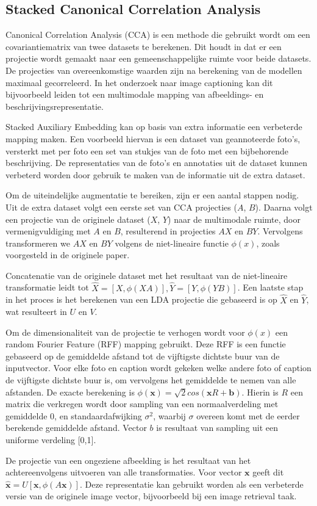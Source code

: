 \subsection{Stacked Canonical Correlation Analysis}
\label{sub:stackedcca}
Canonical Correlation Analysis (CCA) is een methode die gebruikt wordt om een covariantiematrix van twee datasets te berekenen. Dit houdt in dat er een projectie wordt gemaakt naar een gemeenschappelijke ruimte voor beide datasets. De projecties van overeenkomstige waarden zijn na berekening van de modellen maximaal gecorreleerd. In het onderzoek naar image captioning kan dit bijvoorbeeld leiden tot een multimodale mapping van afbeeldings- en beschrijvingsrepresentatie.

Stacked Auxiliary Embedding \cite{Gong2014} kan op basis van extra informatie een verbeterde mapping maken. Een voorbeeld hiervan is een dataset van geannoteerde foto's, versterkt met per foto een set van stukjes van de foto met een bijbehorende beschrijving. De representaties van de foto's en annotaties uit de dataset kunnen verbeterd worden door gebruik te maken van de informatie uit de extra dataset.

Om de uiteindelijke augmentatie te bereiken, zijn er een aantal stappen nodig. Uit de extra dataset volgt een eerste set van CCA projecties ($A$, $B$). Daarna volgt een projectie van de originele dataset ($X$, $Y$) naar de multimodale ruimte, door vermenigvuldiging met $A$ en $B$, resulterend in projecties $AX$ en $BY$. Vervolgens transformeren we $AX$ en $BY$ volgens de niet-lineaire functie $\phi(x)$, zoals voorgesteld in de originele paper.

Concatenatie van de originele dataset met het resultaat van de niet-lineaire transformatie leidt tot $\hat{X} = [X, \phi(XA)], \hat{Y} = [Y, \phi(YB)]$. Een laatste stap in het proces is het berekenen van een LDA projectie die gebaseerd is op $\hat{X}$ en $\hat{Y}$, wat resulteert in $U$ en $V$.


Om de dimensionaliteit van de projectie te verhogen wordt voor $\phi(x)$ een random Fourier Feature (RFF) mapping gebruikt. Deze RFF is een functie gebaseerd op de gemiddelde afstand tot de vijftigste dichtste buur van de inputvector. Voor elke foto en caption wordt gekeken welke andere foto of caption de vijftigste dichtste buur is, om vervolgens het gemiddelde te nemen van alle afstanden. De exacte berekening is $\phi(\mathbf{x})=\sqrt{2}cos(\mathbf{x}R+\mathbf{b})$. Hierin is $R$ een matrix die verkregen wordt door sampling van een normaalverdeling met gemiddelde 0, en standaardafwijking $\sigma^2$, waarbij $\sigma$ overeen komt met de eerder berekende gemiddelde afstand. Vector $b$ is resultaat van sampling uit een uniforme verdeling [0,1].

De projectie van een ongeziene afbeelding is het resultaat van het achtereenvolgens uitvoeren van alle transformaties. Voor vector $\mathbf{x}$ geeft dit $\mathbf{\hat{x}} = U[\mathbf{x}, \phi(A\mathbf{x})]$. Deze representatie kan gebruikt worden als een verbeterde versie van de originele image vector, bijvoorbeeld bij een image retrieval taak.
